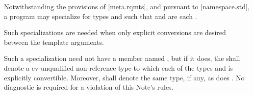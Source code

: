 \pnum
Notwithstanding the provisions of \ref{meta.rqmts}, and
pursuant to \ref{namespace.std},
a program may specialize 
for types  and  such that
 and
 are each .
\begin{note}
Such specializations are needed when only explicit conversions
are desired between the template arguments.
\end{note}
Such a specialization need not have a member named ,
but if it does,
the   shall denote
a cv-unqualified non-reference type
to which each of the types  and  is explicitly convertible.
Moreover,  shall denote
the same type, if any, as does .
No diagnostic is required for a violation of this Note's rules.

